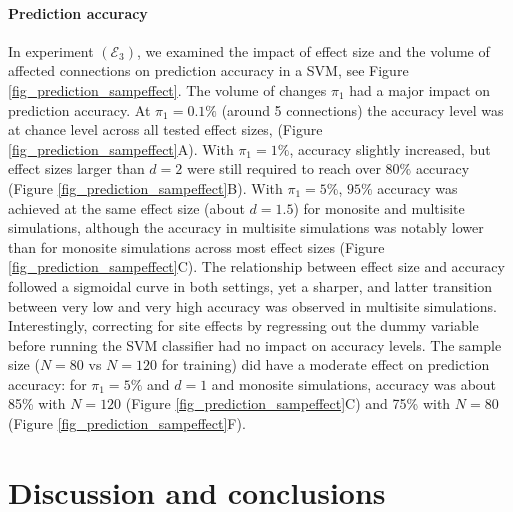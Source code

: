 \documentclass[authoryear]{elsarticle}
\begin{document}
\paragraph{Prediction accuracy}
In experiment $(\mathcal{E}_3)$, we examined the impact of effect size and the volume of affected connections on prediction accuracy in a SVM, see Figure \ref{fig_prediction_sampeffect}. The volume of changes $\pi_1$ had a major impact on prediction accuracy. At $\pi_1=0.1\%$ (around 5 connections) the accuracy level was at chance level across all tested effect sizes, (Figure \ref{fig_prediction_sampeffect}A). With $\pi_1=1\%$, accuracy slightly increased, but effect sizes larger than $d=2$ were still required to reach over $80\%$ accuracy (Figure \ref{fig_prediction_sampeffect}B). With $\pi_1=5\%$, $95\%$ accuracy was achieved at the same effect size (about $d=1.5$) for monosite and multisite simulations, although the accuracy in multisite simulations was notably lower than for monosite simulations across most effect sizes (Figure \ref{fig_prediction_sampeffect}C). The relationship between effect size and accuracy followed a sigmoidal curve in both settings, yet a sharper, and latter transition between very low and very high accuracy was observed in multisite simulations. Interestingly, correcting for site effects by regressing out the dummy variable before running the SVM classifier had no impact on accuracy levels. The sample size ($N=80$ vs $N=120$ for training) did have a moderate effect on prediction accuracy: for $\pi_1=5\%$ and $d=1$ and monosite simulations, accuracy was about 85\% with $N=120$ (Figure \ref{fig_prediction_sampeffect}C) and 75\% with $N=80$ (Figure \ref{fig_prediction_sampeffect}F).


\section{Discussion and conclusions}

\end{document}
